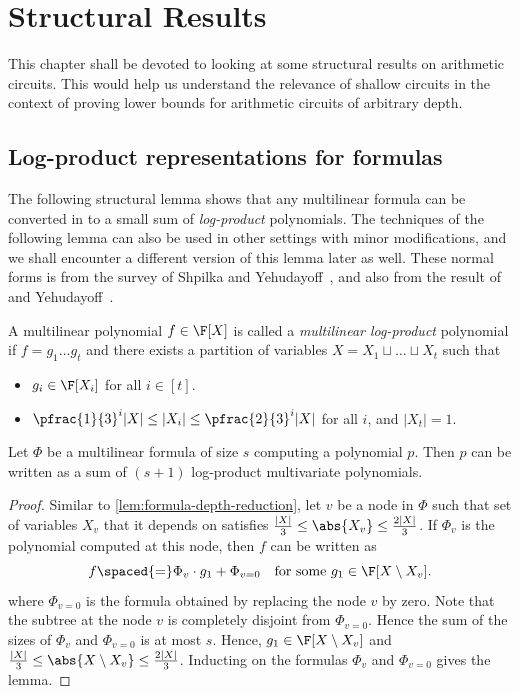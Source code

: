 \chapter{Structural Results}\label{chap:structural-results}

This chapter shall be devoted to looking at some structural results on arithmetic circuits. 
This would help us understand the relevance of shallow circuits in the context of proving lower bounds for arithmetic circuits of arbitrary depth. 

\section{Log-product representations for formulas}

The following structural lemma shows that any multilinear formula can be converted in to a small sum of \emph{log-product} polynomials. 
The techniques of the following lemma can also be used in other settings with minor modifications, and we shall encounter a different version of this lemma later as well.
These normal forms is from the survey of Shpilka and Yehudayoff~\cite{sy}, and also from the result of \Hrubes and Yehudayoff~\cite{HY11a}. 

\begin{definition}\label{defn:mult-logproduct}
  A multilinear polynomial $f\in \F[X]$ is called a \emph{multilinear log-product} polynomial if $f = g_1\dots g_t$ and there exists a partition of variables $X = X_1 \sqcup \dots \sqcup X_t$ such that
  \begin{itemize}
  \item $g_i \in \F[X_i]$ for all $i \in [t]$.
  \item $\pfrac{1}{3}^i |X| \leq |X_i| \leq \pfrac{2}{3}^i |X|$ for all
    $i$, and $|X_t| = 1$.
  \end{itemize}
\end{definition}

\begin{lemma}\label{lem:mult-logproduct}
  Let $\Phi$ be a multilinear formula of size $s$ computing a polynomial $p$. 
Then $p$ can be written as a sum of $(s+1)$ log-product multivariate polynomials.
\end{lemma}
\begin{proof}
  Similar to \autoref{lem:formula-depth-reduction}, let $v$ be a node in $\Phi$ such that set of variables $X_v$ that it depends on satisfies $\frac{|X|}{3} \leq \abs{X_v} \leq \frac{2|X|}{3}$. 
If $\Phi_v$ is the polynomial computed at this node, then $f$ can be written as
  $$
  f \spaced{=} \Phi_v \cdot g_1 + \Phi_{v=0} \quad\text{for some $g_1 \in \F[X\setminus X_v]$}.
  $$
  where $\Phi_{v=0}$ is the formula obtained by replacing the node $v$ by zero. 
Note that the subtree at the node $v$ is completely disjoint from $\Phi_{v=0}$. 
Hence the sum of the sizes of $\Phi_v$ and $\Phi_{v=0}$ is at most $s$. 
Hence, $g_1 \in \F[X\setminus X_v]$ and $\frac{|X|}{3} \leq \abs{X \setminus X_v} \leq \frac{2|X|}{3}$. 
Inducting on the formulas $\Phi_v$ and $\Phi_{v=0}$ gives the lemma.
\end{proof}

